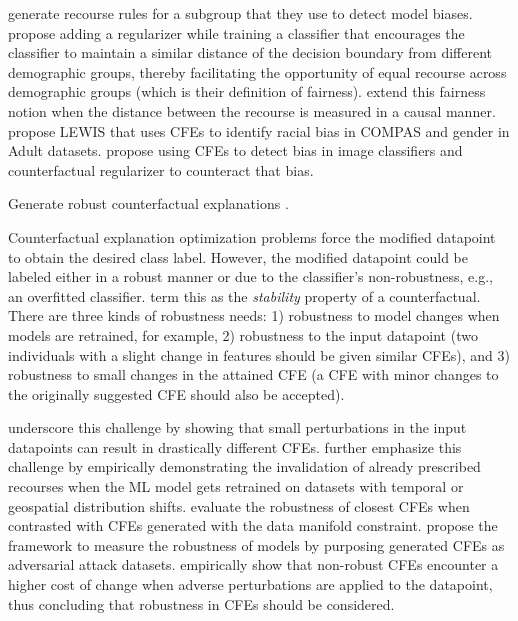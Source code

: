 \progress
\citet{hima-beyond-recourse-globalcfe} generate recourse rules for a subgroup that they use to detect model biases. 
\citet{Gupta2019EqualRecourse} propose adding a regularizer while training a classifier that encourages the classifier to maintain a similar distance of the decision boundary from different demographic groups, thereby facilitating the opportunity of equal recourse across demographic groups (which is their definition of fairness). 
\citet{vonKgelgen2020EqualRecourse2} extend this fairness notion when the distance between the recourse is measured in a causal manner.  
\citet{galhotra-sigmod-cfe} propose LEWIS that uses CFEs to identify racial bias in COMPAS and gender in Adult datasets. 
\citet{Dash-evaluate-bias-images} propose using CFEs to detect bias in image classifiers and counterfactual regularizer to counteract that bias. 

\begin{challenge}\label{ch:robust}
Generate robust counterfactual explanations \citep{another-robustness-cfe-ferrario, mishra-cfe-robustness-survey}. 
\end{challenge}
Counterfactual explanation optimization problems force the modified datapoint to obtain the desired class label. However, the modified datapoint could be labeled either in a robust manner or due to the classifier's non-robustness, e.g., an overfitted classifier. \citet{issues_posthoc} term this as the \emph{stability} property of a counterfactual.  
There are three kinds of robustness needs: 1) robustness to model changes when models are retrained, for example, 2) robustness to the input datapoint (two individuals with a slight change in features should be given similar CFEs), and 3) robustness to small changes in the attained CFE (a CFE with minor changes to the originally suggested CFE should also be accepted). 


\progress
\citet{slack2021manipulated} underscore this challenge by showing that small perturbations in the input datapoints can result in drastically different CFEs. 
\citet{rawal2021robust1} further emphasize this challenge by empirically demonstrating the invalidation of already prescribed recourses when the ML model gets retrained on datasets with temporal or geospatial distribution shifts. 
\citet{Artelt2021Evaluating-robustness} evaluate the robustness of closest CFEs when contrasted with CFEs generated with the data manifold constraint. 
\citet{stress-test-creditscore} propose the framework to measure the robustness of models by purposing generated CFEs as adversarial attack datasets. 
\citet{robustness-KC-score-is-good} empirically show that non-robust CFEs encounter a higher cost of change when adverse perturbations are applied to the datapoint, thus concluding that robustness in CFEs should be considered. 

